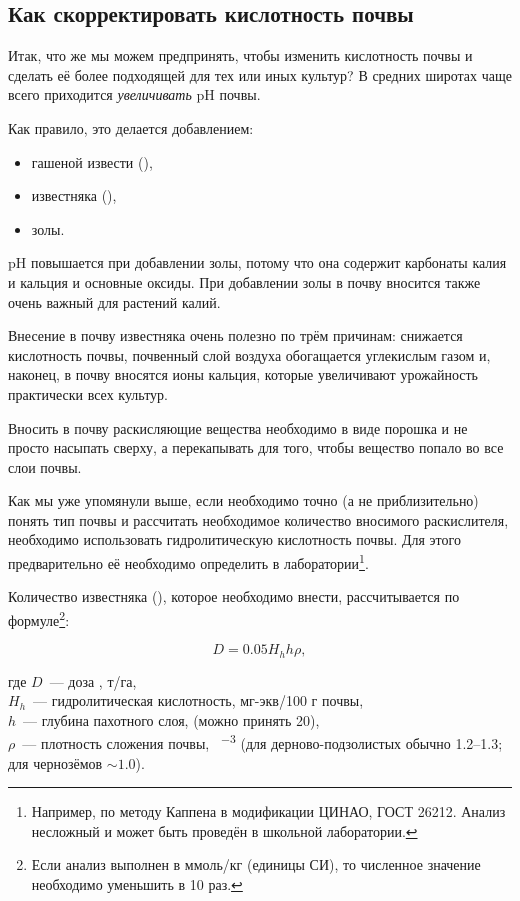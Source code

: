 \subsection*{Как скорректировать кислотность почвы}

Итак, что же мы можем предпринять, чтобы изменить кислотность почвы и сделать её более подходящей для тех или иных культур? В средних широтах чаще всего приходится \emph{увеличивать} pH почвы.

Как правило, это делается добавлением:

\begin{itemize}
    \item гашеной извести (),
    \item известняка (),
    \item золы.
\end{itemize}

pH повышается при добавлении золы, потому что она содержит карбонаты калия и кальция и основные оксиды. При добавлении золы в почву вносится также очень важный для растений калий.

Внесение в почву известняка очень полезно по трём причинам: снижается кислотность почвы, почвенный слой воздуха обогащается углекислым газом и, наконец, в почву вносятся ионы кальция, которые увеличивают урожайность практически всех культур.

Вносить в почву раскисляющие вещества необходимо в виде порошка и не просто насыпать сверху, а перекапывать для того, чтобы вещество попало во все слои почвы.

Как мы уже упомянули выше, если необходимо точно (а не приблизительно) понять тип почвы и рассчитать необходимое количество вносимого раскислителя, необходимо использовать гидролитическую кислотность почвы. Для этого предварительно её необходимо определить в лаборатории\footnote{Например, по методу Каппена в модификации ЦИНАО, ГОСТ 26212. Анализ несложный и может быть проведён в школьной лаборатории.}.

Количество известняка (), которое необходимо внести, рассчитывается по формуле\footnote{Если анализ выполнен в ммоль/кг (единицы СИ), то численное значение необходимо уменьшить в 10 раз.}:

\begin{equation*}
    D = \num{0,05}H_hh\rho,
\end{equation*}

\noindent где $D$~--- доза , т/га,\\
$H_h$~--- гидролитическая кислотность, мг-экв/100 г почвы,\\
$h$~--- глубина пахотного слоя, \unit{\ruCm} (можно принять \qty{20}{\ruCm}),\\
$\rho$~--- плотность сложения почвы, \unit{\ruG\per\ruCm^3} (для дерново-подзолистых обычно \num{1,2}--\num{1,3}; для чернозёмов $\sim\num{1,0}$).

